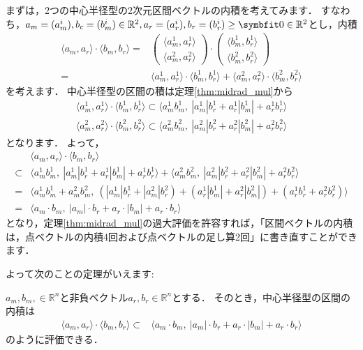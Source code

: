 まずは，2つの中心半径型の2次元区間ベクトルの内積を考えてみます．
すなわち，$a_m = (a_m^{i}), b_c = (b_m^{i}) \in {\mathbb R}^2, a_r = (a_r^{i}),  b_r = (b_r^{i}) \ge \vector{0} \in {\mathbb R}^2$とし，内積
	\begin{align*}
		\langle a_m, a_r \rangle \cdot \langle b_m, b_r \rangle =& \left( \begin{array}{c}
			\langle a_m^1, a_r^1 \rangle \\
			\langle a_m^2, a_r^2 \rangle
		\end{array} \right) \cdot \left( \begin{array}{c}
			\langle b_m^1, b_r^1 \rangle \\
			\langle b_m^2, b_r^2 \rangle
		\end{array} \right) \\
		=& \langle a_m^1, a_r^1 \rangle \cdot \langle b_m^1, b_r^1 \rangle + \langle a_m^2, a_r^2 \rangle \cdot \langle b_m^2, b_r^2 \rangle
	\end{align*}
を考えます．
中心半径型の区間の積は定理\ref{thm:midrad_mul}から
	\begin{align*}
		\langle a_m^1, a_r^1 \rangle \cdot \langle b_m^1, b_r^1 \rangle \subset \langle a_m^1  b_m^1, ~ |a_m^1| b_r^1 + a_r^1 | b_m^1 | + a_r^1 b_r^1 \rangle \\
		\langle a_m^2, a_r^2 \rangle \cdot \langle b_m^2, b_r^2 \rangle \subset \langle a_m^2  b_m^2, ~ |a_m^2| b_r^2 + a_r^2 | b_m^2 | + a_r^2 b_r^2 \rangle
	\end{align*}
となります．
よって，	
	\begin{align*}
		& \langle a_m, a_r \rangle \cdot \langle b_m, b_r \rangle \\
	\subset&  \langle a_m^1  b_m^1, ~ |a_m^1| b_r^1 + a_r^1 | b_m^1 | + a_r^1 b_r^1 \rangle + \langle a_m^2  b_m^2, ~ |a_m^2| b_r^2 + a_r^2 | b_m^2 | + a_r^2 b_r^2 \rangle \\
	=& \langle a_m^1  b_m^1 +  a_m^2  b_m^2, ~ ( |a_m^1| b_r^1 + |a_m^2| b_r^2  ) + ( a_r^1 | b_m^1 | + a_r^2 | b_m^2 | ) + ( a_r^1 b_r^1 + a_r^2 b_r^2) \rangle \\
	=& \langle a_m \cdot  b_m, ~ |a_m| \cdot b_r + a_r \cdot | b_m | + a_r \cdot b_r \rangle
	\end{align*}
となり，定理\ref{thm:midrad_mul}の過大評価を許容すれば，「区間ベクトルの内積は，点ベクトルの内積4回および点ベクトルの足し算2回」に書き直すことができます．

よって次のことの定理がいえます:
\begin{Thm}[中心半径型の区間ベクトルの内積] \label{thm:midrad_inner}
	$a_m,  b_m, \in {\mathbb R}^n$と非負ベクトル$a_r, b_r \in {\mathbb R}^n$とする．	  
	そのとき，中心半径型の区間の内積は
	\begin{align*}
		\langle a_m, a_r \rangle \cdot \langle b_m, b_r \rangle \subset& \langle a_m \cdot b_m, ~ | a_m | \cdot b_r + a_r \cdot | b_m | + a_r \cdot b_r \rangle
	\end{align*}
	のように評価できる．
\end{Thm}

